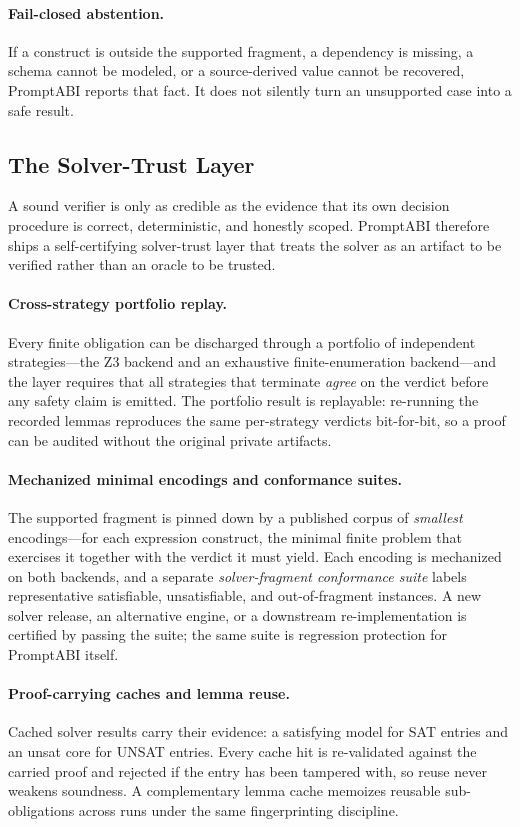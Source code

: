 \documentclass[10pt]{article}
\begin{document}
\paragraph{Fail-closed abstention.}
If a construct is outside the supported fragment, a dependency is missing, a
schema cannot be modeled, or a source-derived value cannot be recovered,
PromptABI reports that fact. It does not silently turn an unsupported case into
a safe result.

\subsection{The Solver-Trust Layer}

A sound verifier is only as credible as the evidence that its own decision
procedure is correct, deterministic, and honestly scoped. PromptABI therefore
ships a self-certifying solver-trust layer that treats the solver as an artifact
to be verified rather than an oracle to be trusted.

\paragraph{Cross-strategy portfolio replay.}
Every finite obligation can be discharged through a portfolio of independent
strategies---the Z3 backend and an exhaustive finite-enumeration backend---and
the layer requires that all strategies that terminate \emph{agree} on the
verdict before any safety claim is emitted. The portfolio result is replayable:
re-running the recorded lemmas reproduces the same per-strategy verdicts
bit-for-bit, so a proof can be audited without the original private artifacts.

\paragraph{Mechanized minimal encodings and conformance suites.}
The supported fragment is pinned down by a published corpus of \emph{smallest}
encodings---for each expression construct, the minimal finite problem that
exercises it together with the verdict it must yield. Each encoding is mechanized
on both backends, and a separate \emph{solver-fragment conformance suite} labels
representative satisfiable, unsatisfiable, and out-of-fragment instances. A new
solver release, an alternative engine, or a downstream re-implementation is
certified by passing the suite; the same suite is regression protection for
PromptABI itself.

\paragraph{Proof-carrying caches and lemma reuse.}
Cached solver results carry their evidence: a satisfying model for SAT entries
and an unsat core for UNSAT entries. Every cache hit is re-validated against the
carried proof and rejected if the entry has been tampered with, so reuse never
weakens soundness. A complementary lemma cache memoizes reusable sub-obligations
across runs under the same fingerprinting discipline.
\end{document}
